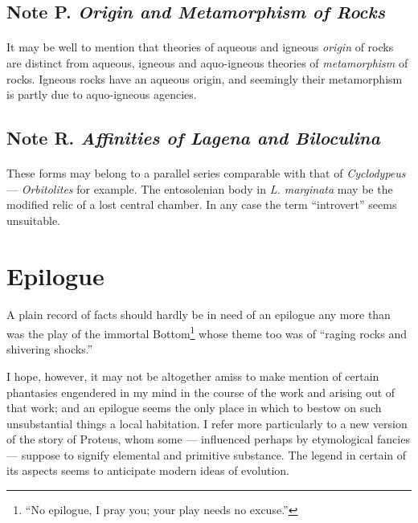 \documentclass[a4paper, 12pt, oneside, landscape]{article}
\begin{document}
\subsection{Note P. \emph{Origin and Metamorphism of Rocks}}
\paragraph{}
It may be well to mention that theories of aqueous and igneous \emph{origin} of rocks are distinct from aqueous, igneous and aquo-igneous theories of \emph{metamorphism} of rocks. Igneous rocks have an aqueous origin, and seemingly their metamorphism is partly due to aquo-igneous agencies.

\subsection{Note R. \emph{Affinities of Lagena and Biloculina}}
\paragraph{}
These forms may belong to a parallel series comparable with that of \emph{Cyclodypeus} --- \emph{Orbitolites} for example. The entosolenian body in \emph{L. marginata} may be the modified relic of a lost central chamber. In any case the term ``introvert'' seems unsuitable.
\clearpage
\section{Epilogue}
\paragraph{}
A plain record of facts should hardly be in need of an epilogue any more than was the play of the immortal Bottom\footnote{``No epilogue, I pray you; your play needs no excuse.''} whose theme too was of ``raging rocks and shivering shocks.''

I hope, however, it may not be altogether amiss to make mention of certain phantasies engendered in my mind in the course of the work and arising out of that work; and an epilogue seems the only place in which to bestow on such unsubstantial things a local habitation. I refer more particularly to a new version of the story of Proteus, whom some --- influenced perhaps by etymological fancies --- suppose to signify elemental and primitive substance. The legend in certain of its aspects seems to anticipate modern ideas of evolution.
\end{document}
